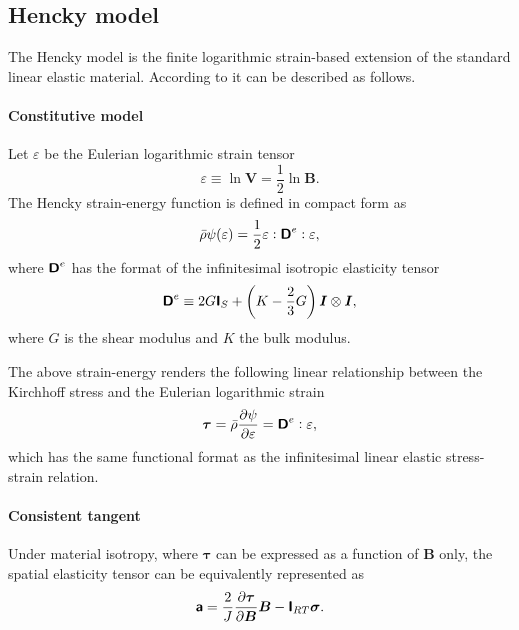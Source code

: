 \subsection{Hencky model}

The Hencky model is the finite logarithmic strain-based extension of the standard linear elastic material.
According to \cite{de2008computational} it can be described as follows.

\paragraph{Constitutive model}
Let \(\varepsilon\) be the Eulerian logarithmic strain tensor
\begin{equation} \label{eq:def_eulerian_log_strain}
\varepsilon \equiv \ln \boldsymbol{V}=\frac{1}{2} \ln \boldsymbol{B}.
\end{equation}
The Hencky strain-energy function is defined in compact form as
\begin{equation}
\bar{\rho} \psi(\varepsilon)=\frac{1}{2} \varepsilon: \boldsymbol{\mathsf{D}}^e: \varepsilon,
\end{equation}
where \(\boldsymbol{\mathsf{D}}^e\) has the format of the infinitesimal isotropic elasticity tensor
\begin{equation}
\boldsymbol{\mathsf{D}}^e \equiv 2 G \boldsymbol{\mathsf{I}}_{S}+\left(K-\frac{2}{3} G\right) \boldsymbol{I} \otimes \boldsymbol{I},
\end{equation}
where \(G\) is the shear modulus and \(K\) the bulk modulus.

The above strain-energy renders the following linear relationship between the Kirchhoff stress and the Eulerian logarithmic strain
\begin{equation} \label{eq:hencky_stres_relation}
\bm\tau=\bar{\rho} \frac{\partial \psi}{\partial \varepsilon}=\boldsymbol{\mathsf{D}}^e: \varepsilon,
\end{equation}
which has the same functional format as the infinitesimal linear elastic stress-strain relation.

\paragraph{Consistent tangent}

Under material isotropy, where \(\boldsymbol{\tau}\) can be expressed as a function of \(\boldsymbol{B}\) only, the spatial elasticity tensor can be equivalently represented as
\begin{equation} \label{eq:hecky_spatial_tangent_moduli_1st}
\boldsymbol{\mathsf{a}}=\frac{2}{J} \frac{\partial \bm \tau}{\partial \bm B} \bm B-\boldsymbol{\mathsf{I}}_{RT}\bm \sigma .
\end{equation}

